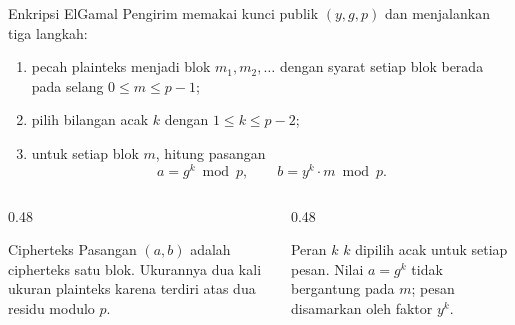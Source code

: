 \documentclass[aspectratio=169,11pt]{beamer}
\begin{document}
\begin{frame}{Enkripsi ElGamal}
    \footnotesize
    Pengirim memakai kunci publik $(y,g,p)$ dan menjalankan tiga langkah:
    \begin{enumerate}
        \item pecah plainteks menjadi blok $m_1, m_2, \dots$ dengan syarat
              setiap blok berada pada selang $0 \le m \le p-1$;
        \item pilih bilangan acak $k$ dengan $1 \le k \le p-2$;
        \item untuk setiap blok $m$, hitung pasangan
              \[
                  a = g^{k} \bmod p,
                  \qquad
                  b = y^{k} \cdot m \bmod p .
              \]
    \end{enumerate}
    \vspace{0.1cm}
    \begin{columns}[T,onlytextwidth]
        \begin{column}{0.48\textwidth}
            \begin{block}{Cipherteks}
                \footnotesize
                Pasangan $(a,b)$ adalah cipherteks satu blok. Ukurannya dua
                kali ukuran plainteks karena terdiri atas dua residu modulo
                $p$.
            \end{block}
        \end{column}
        \begin{column}{0.48\textwidth}
            \begin{alertblock}{Peran $k$}
                \footnotesize
                $k$ dipilih acak untuk setiap pesan. Nilai $a = g^{k}$
                tidak bergantung pada $m$; pesan disamarkan oleh faktor
                $y^{k}$.
            \end{alertblock}
        \end{column}
    \end{columns}
\end{frame}
\end{document}
